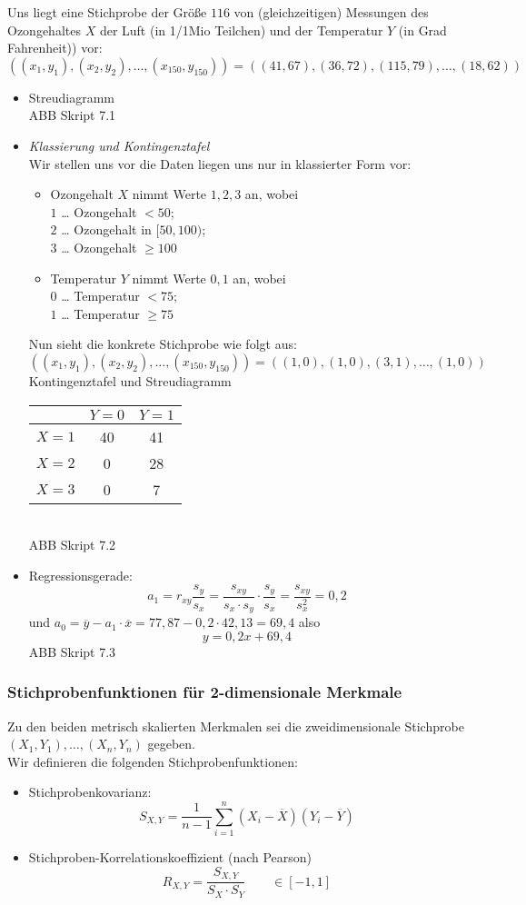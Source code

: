  Uns liegt eine Stichprobe der Größe $116$ von (gleichzeitigen) Messungen des Ozongehaltes $X$ der Luft (in 1/1Mio Teilchen) und der Temperatur $Y$ (in Grad Fahrenheit)) vor:
$$((x_1,y_1),(x_2,y_2), \ldots, (x_{150},y_{150}))=((41,67),(36,72),(115,79),\ldots, (18,62))$$
\begin{itemize}
\item Streudiagramm\\
ABB Skript 7.1
\item \emph{Klassierung und Kontingenztafel}\\
Wir stellen uns vor die Daten liegen uns nur in klassierter Form vor:
\begin{itemize}
\item Ozongehalt $X$ nimmt Werte $1,2,3$ an, wobei\\
$1$ … Ozongehalt $<50$;\\
$2$ … Ozongehalt in $[50,100)$;\\
$3$ … Ozongehalt $\geq 100$
\item Temperatur $Y$ nimmt Werte $0,1$ an, wobei\\
$0$ … Temperatur $<75$;\\
$1$ … Temperatur $\geq 75$
\end{itemize}
Nun sieht die konkrete Stichprobe wie folgt aus:
$$((x_1,y_1),(x_2,y_2),\ldots,(x_{150},y_{150}))=((1,0),(1,0),(3,1),\ldots,(1,0))$$
Kontingenztafel und Streudiagramm\\
\begin{tabular}{c | c c}
& $Y=0$ & $Y=1$\\\hline
$X=1$ & 40 & 41\\
$X=2$ & 0 & 28\\
$X=3$ & 0 & 7
\end{tabular}\\
ABB Skript 7.2
\item Regressionsgerade:
$$a_1=r_{xy}\frac{s_y}{s_x}=\frac{s_{xy}}{s_x \cdot s_y}\cdot \frac{s_y}{s_x}=\frac{s_{xy}}{s_x^2}=0,2$$
und $a_0=\overline{y}-a_1 \cdot \overline{x}=77,87 - 0,2 \cdot 42,13 = 69,4$ also 
$$y=0,2 x + 69,4$$
ABB Skript 7.3
\end{itemize}

\subsubsection{Stichprobenfunktionen für 2-dimensionale Merkmale}

 Zu den beiden metrisch skalierten Merkmalen sei die zweidimensionale Stichprobe $(X_1,Y_1),\ldots, (X_n, Y_n)$ gegeben.\\
Wir definieren die folgenden Stichprobenfunktionen:
\begin{itemize}
\item Stichprobenkovarianz:
$$S_{X,Y}=\frac{1}{n-1}\sum_{i=1}^n(X_i - \overline{X})(Y_i-\overline{Y})$$
\item Stichproben-Korrelationskoeffizient (nach Pearson)
$$R_{X,Y}=\frac{S_{X,Y}}{S_X\cdot S_Y} \qquad \in [-1,1]$$
\end{itemize}

